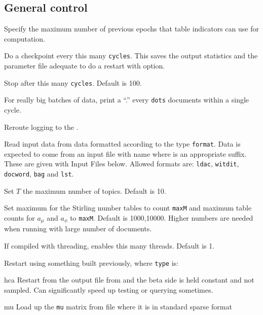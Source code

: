 \documentclass[a4paper,english]{article}
\begin{document}
\subsection{General control}
\begin{Description}\setlength{\itemsep}{0cm}
\item[\OptArg{-b}{epochs}] 
Specify the maximum number of previous epochs that table indicators can use for computation.
\item[\OptArg{-c}{cycles}] 
Do a checkpoint every this many \texttt{cycles}.
This saves the output statistics and the parameter file
adequate to do a restart with  option.
\item[\OptArg{-C}{cycles}] 
Stop after this many \texttt{cycles}.
Default is 100. 
\item[\OptArg{-d}{dots}] 
For really big batches of data, print a 
``.'' every \texttt{dots} documents within a single cycle.
\item[\Opt{-e}]
Reroute logging to the .
\item[\OptArg{-f}{format}] 
Read input data from data formatted according to
the type \texttt{format}.  Data is expected to come from
an input file with name  where
 is an appropriate suffix.
These are given with Input Files below.
Allowed formats are:
\texttt{ldac}, \texttt{witdit}, \texttt{docword}, 
\texttt{bag}
and \texttt{lst}.
\item[\OptArg{-K}{topics}] 
Set $T$ the maximum number of topics.
Default is 10.
\item[\OptArg{-N}{maxN,maxM}] 
Set maximum for the Stirling number tables
to count \texttt{maxM} and maximum table counts for $a_{\mu}$ and $a_{\phi}$ to \texttt{maxM}.
Default is 1000,10000. Higher numbers are needed when running with large number of documents.
\item[\OptArg{-q}{threads}] If compiled with threading, enables
this many threads.  Default is 1.
\item[\OptArg{-r}{type}]
Restart using something built previously, where \texttt{type} is:
\begin{Description}[type]\setlength{\itemsep}{0cm}
\item[hca]
Restart from the output file from 
and the beta side is held constant and not sampled.
Can significantly speed up testing or querying sometimes.
\item[mu]
Load up the \texttt{mu} matrix from file 
where it is in standard sparse format

\end{Description}
\end{Description}
\end{document}
